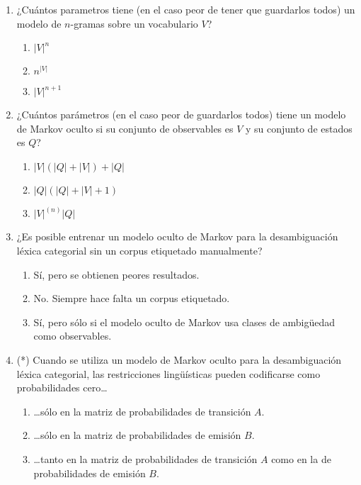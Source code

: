 \documentclass[12pt,a4paper]{article}
\begin{document}
\begin{enumerate}
\item ¿Cuántos parametros tiene (en el caso peor de tener que
  guardarlos todos) un modelo de \(n\)-gramas sobre un vocabulario \(V\)?
  \begin{enumerate}
  \item \(|V|^n\)
  \item \(n^{|V|}\)
  \item \(|V|^{n+1}\)
  \end{enumerate}


\item ¿Cuántos parámetros (en el caso peor de guardarlos todos) tiene  un modelo de Markov oculto si su conjunto de observables es \(V\) y su conjunto de estados es \(Q\)? 
  \begin{enumerate}
  \item \(|V|(|Q|+|V|)+|Q|\)
  \item \(|Q|(|Q|+|V|+1)\)
  \item \(|V|^{(n)}|Q|\)
  \end{enumerate}

\item ¿Es posible entrenar un modelo oculto de Markov para la desambiguación léxica categorial sin un corpus etiquetado manualmente?
  \begin{enumerate}
  \item Sí, pero se obtienen peores resultados.
  \item No. Siempre hace falta un corpus etiquetado.
  \item Sí, pero sólo si el modelo oculto de Markov usa clases de ambigüedad como observables.
  \end{enumerate}

\item (*) Cuando se utiliza un modelo de Markov oculto para la desambiguación léxica categorial, las restricciones lingüísticas pueden codificarse como probabilidades cero\ldots
  \begin{enumerate}
  \item\ldots sólo en la matriz de probabilidades de transición \(A\).
  \item\ldots sólo en la matriz de probabilidades de emisión  \(B\).
  \item \ldots tanto en la matriz de probabilidades de transición \(A\) como en la de probabilidades de emisión \(B\).
  \end{enumerate}


\end{enumerate}
\end{document}
